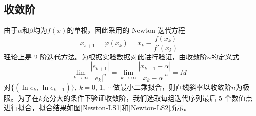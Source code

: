 \documentclass[11pt]{article}
\begin{document}
\subsection{收敛阶}
由于$\alpha$和$\beta$均为$f(x)$的单根，因此采用的 Newton 迭代方程
\begin{equation}
    x_{k + 1} = \varphi(x_k) = x_k - \frac{f(x_k)}{f'(x_k)} \label{6} \tag{6}
\end{equation}
理论上是 2 阶迭代方法。为根据实验数据对此进行验证，由收敛阶$n$的定义式
\begin{equation*}
    \lim_{k \rightarrow \infty}{\frac{\left|e_{k + 1}\right|}{\left|e_{k}\right|^n}} = \lim_{k \rightarrow \infty}{\frac{\left|x_{k + 1} - \alpha \right|}{\left|x_k - \alpha \right|^n}} = M
\end{equation*}
对$\{(\ln{e_{k}},\, \ln{e_{k + 1}})\},\ k = 0,\, 1,\, \cdots$做最小二乘拟合，则直线斜率以收敛阶$n$为极限。为了在$k$充分大的条件下验证收敛阶，我们选取每组迭代序列最后 5 个数值点进行拟合，拟合结果如图\ref{Newton-LS1}和\ref{Newton-LS2}所示。
\end{document}
